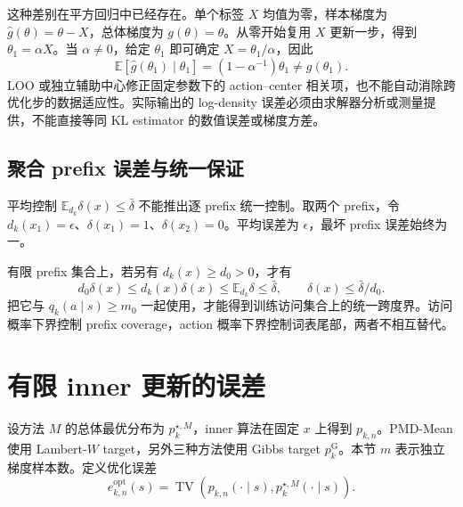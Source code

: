 \documentclass[lang=cn,scheme=chinese,openany]{../book/elegantbook}
\newcommand{\E}{\mathbb E}
\begin{document}
这种差别在平方回归中已经存在。单个标签 $X$ 均值为零，样本梯度为 $\widehat g(\theta)=\theta-X$，总体梯度为 $g(\theta)=\theta$。从零开始复用 $X$ 更新一步，得到 $\theta_1=\alpha X$。当 $\alpha\ne0$，给定 $\theta_1$ 即可确定 $X=\theta_1/\alpha$，因此
\begin{equation}
\E[\widehat g(\theta_1)\mid\theta_1]
=(1-\alpha^{-1})\theta_1\ne g(\theta_1).
\end{equation}
LOO 或独立辅助中心修正固定参数下的 action--center 相关项，也不能自动消除跨优化步的数据适应性。实际输出的 log-density 误差必须由求解器分析或测量提供，不能直接等同 KL estimator 的数值误差或梯度方差。

\subsection{聚合 prefix 误差与统一保证}
\label{dyn:coverage-gap}

平均控制 $\E_{d_k}\delta(x)\le\bar\delta$ 不能推出逐 prefix 统一控制。取两个 prefix，令 $d_k(x_1)=\epsilon$、$\delta(x_1)=1$、$\delta(x_2)=0$。平均误差为 $\epsilon$，最坏 prefix 误差始终为一。

有限 prefix 集合上，若另有 $d_k(x)\ge d_0>0$，才有
\begin{equation}
d_0\delta(x)\le d_k(x)\delta(x)\le\E_{d_k}\delta\le\bar\delta,
\qquad\delta(x)\le\bar\delta/d_0.
\end{equation}
把它与 $q_k(a\mid s)\ge m_0$ 一起使用，才能得到训练访问集合上的统一跨度界。访问概率下界控制 prefix coverage，action 概率下界控制词表尾部，两者不相互替代。



\section{有限 inner 更新的误差}

设方法 $M$ 的总体最优分布为 $p_k^{\star,M}$，inner 算法在固定 $x$ 上得到 $p_{k,n}$。PMD-Mean 使用 Lambert-$W$ target，另外三种方法使用 Gibbs target $p_k^{\mathrm G}$。本节 $m$ 表示独立梯度样本数。定义优化误差
\begin{equation*}
e^{\mathrm{opt}}_{k,n}(s)=\operatorname{TV}\!\left(p_{k,n}(\cdot\mid s),p_k^{\star,M}(\cdot\mid s)\right).
\end{equation*}
\end{document}
